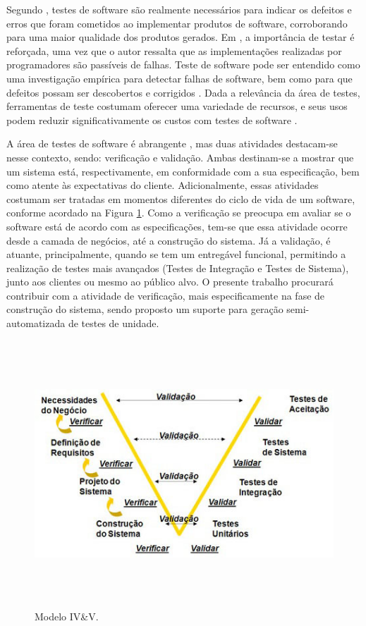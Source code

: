 Segundo \cite{singh2012software}, testes de software são realmente necessários para indicar os defeitos e erros que foram cometidos ao implementar produtos de software, corroborando para uma maior qualidade dos produtos gerados. Em \cite{jorgensen_software_2013}, a importância de testar é reforçada, uma vez que o autor ressalta que as implementações realizadas por programadores são passíveis de falhas. Teste de software pode ser entendido como uma investigação empírica para detectar falhas de software, bem como para que defeitos possam ser descobertos e corrigidos \cite{sommerville2011engenharia}. Dada a relevância da área de testes, ferramentas de teste costumam oferecer uma variedade de recursos, e seus usos podem reduzir significativamente os custos com testes de software \cite{sommerville2011engenharia}.

A área de testes de software é abrangente \cite{sommerville2011engenharia}, mas duas atividades destacam-se nesse contexto, sendo: verificação e validação. Ambas destinam-se a mostrar que um sistema está, respectivamente, em conformidade com a sua especificação, bem como atente às expectativas do cliente. Adicionalmente, essas atividades costumam ser tratadas em momentos diferentes do ciclo de vida de um software, conforme acordado na Figura \ref{modelo-iv-v}. Como a verificação se preocupa em avaliar se o software está de acordo com as especificações, tem-se que essa atividade ocorre desde a camada de negócios, até a construção do sistema. Já a validação, é atuante, principalmente, quando se tem um entregável funcional, permitindo a realização de testes mais avançados (Testes de Integração e Testes de Sistema), junto aos clientes ou mesmo ao público alvo. O presente trabalho procurará contribuir com a atividade de verificação, mais especificamente na fase de construção do sistema, sendo proposto um suporte para geração semi-automatizada de testes de unidade. 

\begin{figure}[h]
\centering 
\includegraphics[width=17cm,height=10cm]{figuras/modelo-iv-v.jpg}
\caption{Modelo IV\&V.}
\label{modelo-iv-v}
\end{figure}

